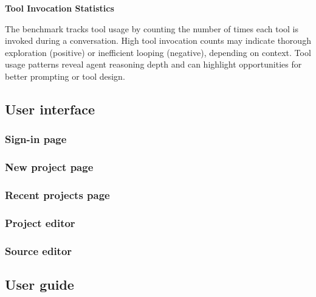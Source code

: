 \textbf{Tool Invocation Statistics}

The benchmark tracks tool usage by counting the number of times each tool is invoked during a conversation.
High tool invocation counts may indicate thorough exploration (positive) or inefficient looping (negative), depending on context.
Tool usage patterns reveal agent reasoning depth and can highlight opportunities for better prompting or tool design.

\subsection{User interface}

\subsubsection{Sign-in page}
\subsubsection{New project page}
\subsubsection{Recent projects page}
\subsubsection{Project editor}
\subsubsection{Source editor}

\subsection{User guide}

